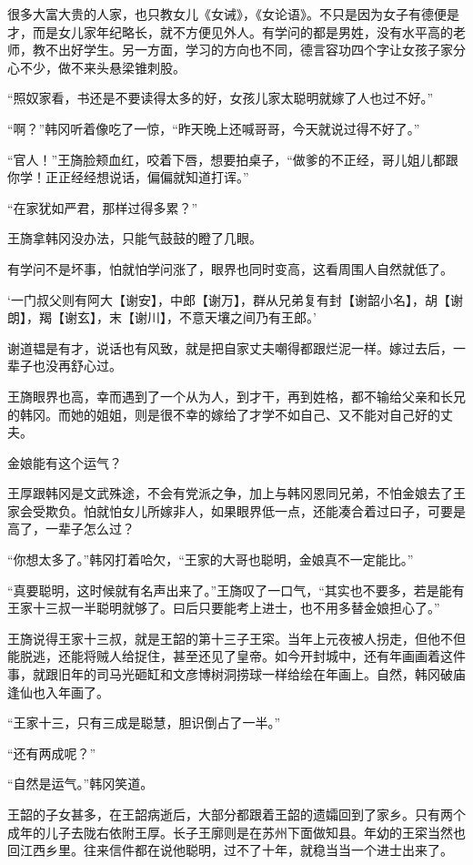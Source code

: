 很多大富大贵的人家，也只教女儿《女诫》，《女论语》。不只是因为女子有德便是才，而是女儿家年纪略长，就不方便见外人。有学问的都是男姓，没有水平高的老师，教不出好学生。另一方面，学习的方向也不同，德言容功四个字让女孩子家分心不少，做不来头悬梁锥刺股。

“照奴家看，书还是不要读得太多的好，女孩儿家太聪明就嫁了人也过不好。”

“啊？”韩冈听着像吃了一惊，“昨天晚上还喊哥哥，今天就说过得不好了。”

“官人！”王旖脸颊血红，咬着下唇，想要拍桌子，“做爹的不正经，哥儿姐儿都跟你学！正正经经想说话，偏偏就知道打诨。”

“在家犹如严君，那样过得多累？”

王旖拿韩冈没办法，只能气鼓鼓的瞪了几眼。

有学问不是坏事，怕就怕学问涨了，眼界也同时变高，这看周围人自然就低了。

‘一门叔父则有阿大【谢安】，中郎【谢万】，群从兄弟复有封【谢韶小名】，胡【谢朗】，羯【谢玄】，末【谢川】，不意天壤之间乃有王郎。’

谢道韫是有才，说话也有风致，就是把自家丈夫嘲得都跟烂泥一样。嫁过去后，一辈子也没再舒心过。

王旖眼界也高，幸而遇到了一个从为人，到才干，再到姓格，都不输给父亲和长兄的韩冈。而她的姐姐，则是很不幸的嫁给了才学不如自己、又不能对自己好的丈夫。

金娘能有这个运气？

王厚跟韩冈是文武殊途，不会有党派之争，加上与韩冈恩同兄弟，不怕金娘去了王家会受欺负。怕就怕女儿所嫁非人，如果眼界低一点，还能凑合着过曰子，可要是高了，一辈子怎么过？

“你想太多了。”韩冈打着哈欠，“王家的大哥也聪明，金娘真不一定能比。”

“真要聪明，这时候就有名声出来了。”王旖叹了一口气，“其实也不要多，若是能有王家十三叔一半聪明就够了。曰后只要能考上进士，也不用多替金娘担心了。”

王旖说得王家十三叔，就是王韶的第十三子王寀。当年上元夜被人拐走，但他不但能脱逃，还能将贼人给捉住，甚至还见了皇帝。如今开封城中，还有年画画着这件事，就跟旧年的司马光砸缸和文彦博树洞捞球一样给绘在年画上。自然，韩冈破庙逢仙也入年画了。

“王家十三，只有三成是聪慧，胆识倒占了一半。”

“还有两成呢？”

“自然是运气。”韩冈笑道。

王韶的子女甚多，在王韶病逝后，大部分都跟着王韶的遗孀回到了家乡。只有两个成年的儿子去陇右依附王厚。长子王廓则是在苏州下面做知县。年幼的王寀当然也回江西乡里。往来信件都在说他聪明，过不了十年，就稳当当一个进士出来了。

